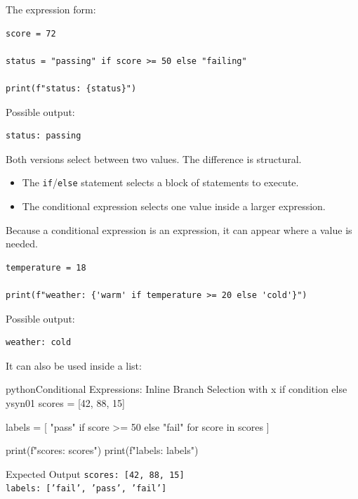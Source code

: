 \documentclass[a4paper,twoside]{report}
\begin{document}
The expression form:

\begin{verbatim}
score = 72

status = "passing" if score >= 50 else "failing"

print(f"status: {status}")
\end{verbatim}

Possible output:

\begin{verbatim}
status: passing
\end{verbatim}

Both versions select between two values. The difference is structural.

\begin{itemize}
    \item The \texttt{if}/\texttt{else} statement selects a block of statements to execute.
    \item The conditional expression selects one value inside a larger expression.
\end{itemize}

Because a conditional expression is an expression, it can appear where a value is needed.

\begin{verbatim}
temperature = 18

print(f"weather: {'warm' if temperature >= 20 else 'cold'}")
\end{verbatim}

Possible output:

\begin{verbatim}
weather: cold
\end{verbatim}

It can also be used inside a list:

\begin{codebox}[]{python}{Conditional Expressions: Inline Branch Selection with x if condition else y}{syn01}
scores = [42, 88, 15]

labels = [
    "pass" if score >= 50 else "fail"
    for score in scores
]

print(f"scores: {scores}")
print(f"labels: {labels}")
\end{codebox}


\begin{iobox}{Expected Output}
\texttt{scores: [42, 88, 15]} \\
\texttt{labels: ['fail', 'pass', 'fail']} \\
\end{iobox}
\end{document}
